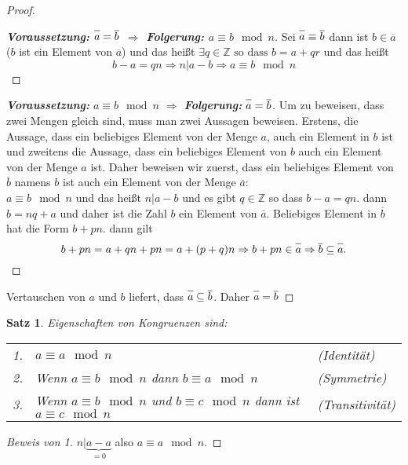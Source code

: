 \documentclass{article}
\theoremstyle{definition}
\theoremstyle{plain}
\newtheorem{sa}[definition]{Satz}
\begin{document}
\begin{proof}
	\begin{proof}[\textbf{Voraussetzung: $ \overline{\vphantom{b}a} = \overline{b} $ 
			$ \Rightarrow $ Folgerung: $ a \equiv b \mod n $}] \let\qed\relax
		Sei $ \overline{\vphantom{b}a} \equiv \overline{b} $ dann ist $ b \in \overline{a} $ ($ b $ ist ein Element von $ \overline{a} $) und das hei\ss t
		\( 
		\exists q \in \mathbb{Z} \,\, \text{so dass} \,\, b = a + qr
		\)
		und das hei\ss t
		\[ 
		b - a = qn \Rightarrow n | a-b \Rightarrow a \equiv b \mod n
		 \]
	\end{proof}
	\begin{proof}[\textbf{Voraussetzung:} $ a \equiv b \mod n $ $ \Rightarrow $ \textbf{Folgerung:} $ \overline{\vphantom{b}a} = \overline{b} $]\let\qed\relax
		Um zu beweisen, dass zwei Mengen gleich sind, muss man zwei Aussagen beweisen. Erstens, die Aussage, dass ein beliebiges Element von der Menge $ a $, auch ein Element in $ b $ ist und zweitens die Aussage, dass ein beliebiges Element von $ b $ auch ein Element von der Menge $ a $ ist. Daher beweisen wir zuerst, dass ein beliebiges Element von $ \overline{b} $ namens $ b $ ist auch ein Element von der Menge $ \overline{a} $: \\
		$ a \equiv b \mod n $ und das hei\ss t $ n | a-b $ und es gibt $ q \in \mathbb{Z} $ so dass 
		$ b - a = qn $. dann $ b = nq+a $ und daher ist die Zahl $ b $ ein Element von $ \overline{a} $. Beliebiges Element in $ \overline{b} $ hat die Form $ b + pn $. dann gilt
		\[ 
		b + pn = a + qn + pn =  a + (p+q)n \Rightarrow b + pn \in \overline{\vphantom{b}a} \Rightarrow \overline{b} \subseteq \overline{\vphantom{b}a}.
		 \]
	\end{proof}
\noindent Vertauschen von $ a $ und $ b $ liefert, dass $ \overline{\vphantom{b}a} \subseteq \overline{b} $. Daher 
$ \overline{\vphantom{b}a} = \overline{b} $
\end{proof}
\begin{sa} Eigenschaften von Kongruenzen sind: \\
	\begin{tabular}{rll}
		1. &  $ a \equiv a \mod n $ & (Identit\"at) \\
		2. &  Wenn $ a \equiv b \mod n $ dann $ b \equiv a \mod n $ & (Symmetrie) \\
		3. &  Wenn $ a \equiv b \mod n $ und $ b \equiv c \mod n $ dann ist $ a \equiv c \mod n $ & (Transitivit\"at)
	\end{tabular}
\end{sa}
\begin{proof}[Beweis von 1]
	$ n | \underbrace{a-a}_{=0} $ also $ a \equiv a \mod n $. 
\end{proof}
\end{document}
